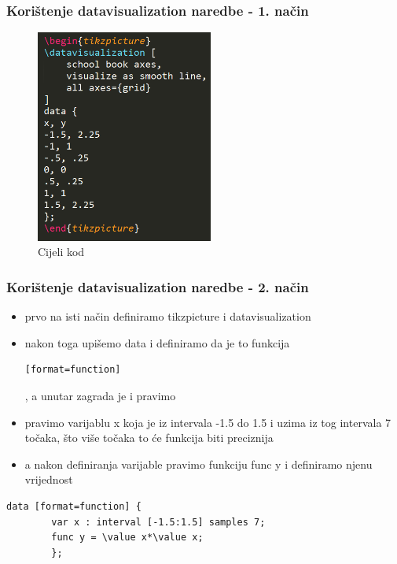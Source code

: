 \documentclass{beamer}
\begin{document}
	\begin{frame}
	\frametitle{Korištenje datavisualization naredbe - 1. način}
		\begin{figure}
			\begin{center}
				\includegraphics[width=12 cm,height=7cm]{graf_2_1_kod.png}
				\caption{Cijeli kod}
			\end{center}
		\end{figure}
	\end{frame}	

\begin{frame}[fragile]
	\frametitle{Korištenje datavisualization naredbe - 2. način}
		\begin{itemize}
			\item prvo na isti način definiramo tikzpicture i datavisualization
			\item nakon toga upišemo data i definiramo da je to funkcija \begin{verbatim}[format=function]\end{verbatim}, a unutar zagrada je i pravimo
			\item pravimo varijablu x koja je iz intervala -1.5 do 1.5 i uzima iz tog intervala 7 točaka, što više točaka to će funkcija biti preciznija
			\item a nakon definiranja varijable pravimo funkciju func y i definiramo njenu vrijednost
		\end{itemize} 
		\begin{verbatim}data [format=function] {
		var x : interval [-1.5:1.5] samples 7;
		func y = \value x*\value x;
		};
		\end{verbatim}
\end{frame}
\end{document}

